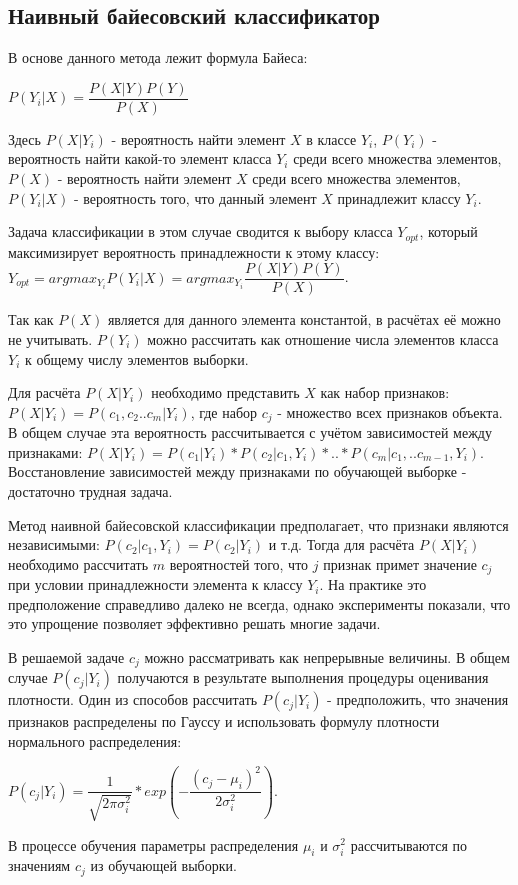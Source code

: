 \subsection{Наивный байесовский классификатор}

В основе данного метода лежит формула Байеса:

$P(Y_i|X)=\dfrac{P(X|Y)P(Y)}{P(X)}$

Здесь $P(X|Y_i)$ - вероятность найти элемент $X$ в классе $Y_i$, $P(Y_i)$ - вероятность найти какой-то элемент класса $Y_i$ среди всего множества элементов, $P(X)$ - вероятность найти элемент $X$ среди всего множества элементов, $P(Y_i|X)$ - вероятность того, что данный элемент $X$ принадлежит классу $Y_i$.

Задача классификации в этом случае сводится к выбору класса $Y_{opt}$, который максимизирует вероятность принадлежности к этому классу: $Y_{opt}=argmax_{Y_i} P(Y_i|X)=argmax_{Y_i} \dfrac{P(X|Y)P(Y)}{P(X)}$.

Так как $P(X)$ является для данного элемента константой, в расчётах её можно не учитывать. $P(Y_i)$ можно рассчитать как отношение числа элементов класса $Y_i$ к общему числу элементов выборки. 

Для расчёта $P(X|Y_i)$ необходимо представить $X$ как набор признаков: $P(X|Y_i)=P(c_1, c_2 .. c_m | Y_i)$, где набор $c_j$ - множество всех признаков объекта. В общем случае эта вероятность рассчитывается с учётом зависимостей между признаками: $P(X|Y_i)=P(c_1|Y_i)*P(c_2|c_1,Y_i)*..*P(c_m|c_1,..c_{m-1},Y_i)$. Восстановление зависимостей между признаками по обучающей выборке - достаточно трудная задача.

Метод наивной байесовской классификации предполагает, что признаки являются независимыми: $P(c_2|c_1,Y_i)=P(c_2|Y_i)$ и т.д. Тогда для расчёта $P(X|Y_i)$ необходимо рассчитать $m$ вероятностей того, что $j$ признак примет значение $c_j$ при условии принадлежности элемента к классу $Y_i$. На практике это предположение справедливо далеко не всегда, однако эксперименты показали, что это упрощение позволяет эффективно решать многие задачи.

В решаемой задаче $c_j$ можно рассматривать как непрерывные величины. В общем случае $P(c_j|Y_i)$ получаются в результате выполнения процедуры оценивания плотности. Один из способов рассчитать $P(c_j|Y_i)$ - предположить, что значения признаков распределены по Гауссу и использовать формулу плотности нормального распределения\cite{sklearn_gnb}:

$P(c_j|Y_i)=\dfrac{1}{\sqrt{2\pi\sigma_i^2}}*exp(-\dfrac{(c_j-\mu_i)^2}{2\sigma_i^2})$.

В процессе обучения параметры распределения $\mu_i$ и $\sigma_i^2$ рассчитываются по значениям $c_j$ из обучающей выборки. 

